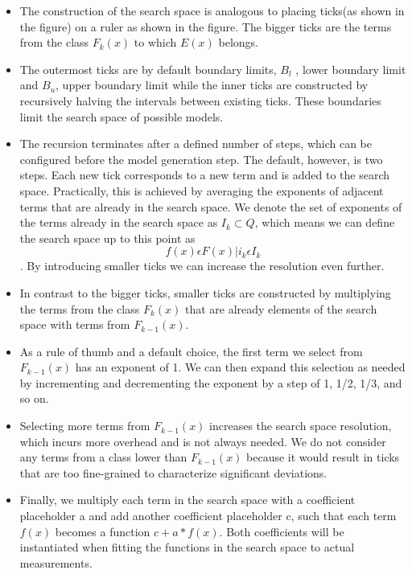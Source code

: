 \documentclass[journal, onecolumn]{IEEEtran}
\begin{document}
\begin{itemize}
\begin{figure}[H]
		\end{figure}
		\item The construction of the search space is analogous to placing ticks(as shown in the figure) on a ruler as shown in the figure. The bigger ticks are the terms from the class $F_k(x)$ to which $E(x)$ belongs. 
		\item The outermost ticks are by default boundary limits, $B_l$ , lower boundary limit and $B_u$, upper boundary limit while the inner ticks are constructed by recursively halving the intervals between existing ticks. These boundaries limit the search space of possible models.
		\item The recursion terminates after a defined number of steps, which can be configured before the model generation step. The default, however, is two steps. Each new tick corresponds to a new term and is added to the search space. Practically, this is achieved by averaging the exponents of adjacent terms that are already in the search space. We denote the set of exponents of the terms already in the search space as $I_k \subset  Q$, which means we can define the search space up to this point as $$ {f(x)  \epsilon   F(x)  |  i_k  \epsilon I_k} $$. By introducing smaller ticks we can increase the resolution even further. 
		\item In contrast to the bigger ticks, smaller ticks are constructed by multiplying the terms from the class $F_k(x)$ that are already elements of the search space with terms from $F_{k-1}(x)$.
		\item As a rule of thumb and a default choice, the first term we select from $F_{k-1}(x)$ has an exponent of 1. We can then expand this selection as needed by incrementing and decrementing the exponent by a step of 1, 1/2, 1/3, and so on. 
		\item Selecting more terms from $F_{k-1}(x)$ increases the search space resolution, which incurs more overhead and is not always needed. We do not consider any terms from a class lower than $F_{k-1}(x)$ because it would result in ticks that are too fine-grained to characterize significant deviations.
		\item Finally, we multiply each term in the search space with a coefficient placeholder a and add another coefficient placeholder c, such that each term $f(x)$ becomes a function $c + a * f(x)$. Both coefficients will be instantiated when fitting the functions in the search space to actual measurements.
	\end{itemize}
	
\end{document}
